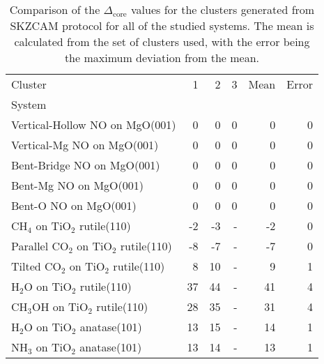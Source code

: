 \begin{table}
\caption{\label{tab:deltacore}Comparison of the $\Delta_\textrm{core}$ values for the clusters generated from SKZCAM protocol for all of the studied systems. The mean is calculated from the set of clusters used, with the error being the maximum deviation from the mean.}
\begin{adjustbox}{center,max width=1\textwidth}
\begin{tabular}{lrrrrr}
\toprule
Cluster & 1 & 2 & 3 & Mean & Error \\ 
System &  &  &  &  &  \\
\midrule
Vertical-Hollow NO on MgO(001) & 0 & 0 & 0 & 0 & 0 \\
Vertical-Mg NO on MgO(001) & 0 & 0 & 0 & 0 & 0 \\
Bent-Bridge NO on MgO(001) & 0 & 0 & 0 & 0 & 0 \\
Bent-Mg NO on MgO(001) & 0 & 0 & 0 & 0 & 0 \\
Bent-O NO on MgO(001) & 0 & 0 & 0 & 0 & 0 \\
CH$_4$ on TiO$_2$ rutile(110) & -2 & -3 & - & -2 & 0 \\
Parallel CO$_2$ on TiO$_2$ rutile(110) & -8 & -7 & - & -7 & 0 \\
Tilted CO$_2$ on TiO$_2$ rutile(110) & 8 & 10 & - & 9 & 1 \\
H$_2$O on TiO$_2$ rutile(110) & 37 & 44 & - & 41 & 4 \\
CH$_3$OH on TiO$_2$ rutile(110) & 28 & 35 & - & 31 & 4 \\
H$_2$O on TiO$_2$ anatase(101) & 13 & 15 & - & 14 & 1 \\
NH$_3$ on TiO$_2$ anatase(101) & 13 & 14 & - & 13 & 1 \\
\bottomrule
\end{tabular}
\end{adjustbox}
\end{table}